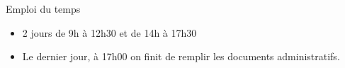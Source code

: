 \begin{frame}{Emploi du temps}
  \begin{itemize}
  \item 2 jours de 9h à 12h30 et de 14h à 17h30
  \item Le dernier jour, à 17h00 on finit de remplir les documents administratifs.
  \end{itemize}
\end{frame}
